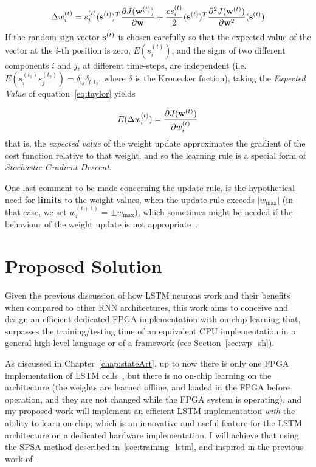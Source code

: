 \begin{equation}\label{eq:taylor}
    \Delta w_i^{(t)} = s_i^{(t)} (\mathbf{s}^{(t)})^T \frac{\partial J(\mathbf{w}^{(t)})}{\partial \mathbf{w}} +
                        \frac{c s_i^{(t)}}{2} (\mathbf{s}^{(t)})^T \frac{\partial^2 J(\mathbf{w}^{(t)})}{\partial \mathbf{w}^2}  (\mathbf{s}^{(t)}) 
\end{equation}
If the random sign vector $\mathbf{s}^{(t)}$ is chosen carefully so that the expected value of the vector at the $i$-th position is zero, $E(s_i^{(t)})$, and the signs of two different components $i$ and $j$, at different time-steps, are independent (i.e. $E(s_i^{(t_1)}s_j^{(t_2)}) = \delta_{ij}\delta_{t_1 t_2}$, where $\delta$ is the Kronecker fuction), taking the \emph{Expected Value} of equation~\ref{eq:taylor} yields 

\begin{equation}\label{eq:spsa_gradProof}
    E(\Delta w_i^{(t)}) = \frac{\partial J(\mathbf{w}^{(t)})}{\partial w_i^{(t)}}
\end{equation}
that is, the \emph{expected value} of the weight update approximates the gradient of the cost function relative to that weight, and so the learning rule is a special form of \textit{Stochastic Gradient Descent}.

One last comment to be made concerning the update rule, is the hypothetical need for \textbf{limits} to the weight values, when the update rule exceeds $|w_{\text{max}}|$ (in that case, we set $w_i^{(t+1)} = \pm w_{\text{max}}$), which sometimes might be needed if the behaviour of the weight update is not appropriate~\cite{Maeda05}.

\section{Proposed Solution}\label{sec:propSol}
Given the previous discussion of how LSTM neurons work and their benefits when compared to other RNN architectures, this work aims to conceive and design an efficient dedicated FPGA implementation with on-chip learning that, surpasses the training/testing time of an equivalent CPU implementation in a general high-level language or of a framework (see Section~\ref{sec:wp_sh}). 

As discussed in Chapter~\ref{chap:stateArt}, up to now there is only one FPGA implementation of LSTM cells~\cite{Chang15}, but there is no on-chip learning on the architecture (the weights are learned offline, and loaded in the FPGA before operation, and they are not changed while the FPGA system is operating), and my proposed work will implement an efficient LSTM implementation \emph{with} the ability to learn on-chip, which is an innovative and useful feature for the LSTM architecture on a dedicated hardware implementation. I will achieve that using the SPSA method described in~\ref{sec:training_lstm}, and inspired in the previous work of~\cite{Maeda05}.

